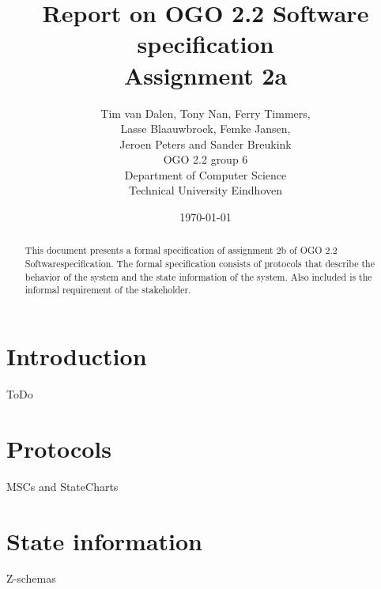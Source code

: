 \documentclass[12pt]{article}
\title{Report on OGO 2.2 Software specification\\ Assignment 2a}
\author{
        Tim van Dalen, Tony Nan, Ferry Timmers, \\ Lasse Blaauwbroek, Femke Jansen, \\Jeroen Peters and Sander Breukink\\ OGO 2.2 group 6 \\
                Department of Computer Science\\
        Technical University Eindhoven\\
}
\date{\today}
\begin{document}
\maketitle

\begin{abstract}
This document presents a formal specification of assignment 2b of OGO 2.2 Softwarespecification. The formal specification consists of protocols that describe the behavior of the system and the state information of the system. Also included is the informal requirement of the stakeholder.
\end{abstract}

\section{Introduction}

ToDo

\section{Protocols}

MSCs and StateCharts

\section{State information}

Z-schemas
\end{document}
